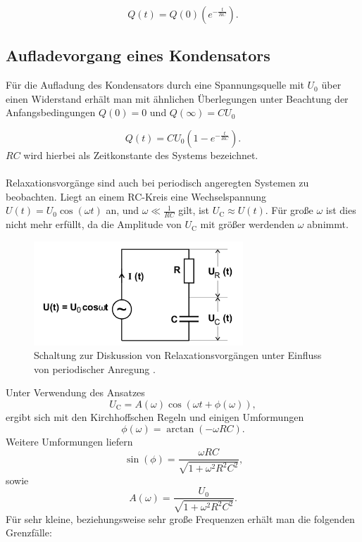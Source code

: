 \begin{equation}
	\label{eqn:aufladung}
	Q(t)=Q(0)(e^{-\frac{t}{RC}}) \text{.}
\end{equation}
\subsection{Aufladevorgang eines Kondensators}
Für die Aufladung des Kondensators durch eine Spannungsquelle mit $U_0$ über einen Widerstand erhält man mit ähnlichen Überlegungen unter Beachtung der Anfangsbedingungen $Q(0)=0$ und $Q(\infty)=CU_\text{0}$

\begin{equation}
	\label{eqn:entladung}
	Q(t)=CU_\text{0}(  1-e^{-\frac{t}{RC}} ) .
\end{equation}
$RC$ wird hierbei als Zeitkonstante des Systems bezeichnet.\\
\\Relaxationsvorgänge sind auch bei periodisch angeregten Systemen zu beobachten.
Liegt an einem RC-Kreis eine Wechselspannung $U(t)=U_\text{0}\cos(\omega t)$ an, und $\omega \ll \frac{1}{RC}$ gilt, ist $U_\text{C} \approx U(t)$.
Für große $\omega$ ist dies nicht mehr erfüllt, da die Amplitude von $U_\text{C}$ mit größer werdenden $\omega$ abnimmt.
\begin{figure}
	\centering
	\includegraphics[width=0.7\textwidth]{bilder/periodisch.png}
	\caption{Schaltung zur Diskussion von Relaxationsvorgängen unter Einfluss von periodischer Anregung \cite{Anleitung}.}
	\label{fig:periodisch}
\end{figure}
Unter Verwendung des Ansatzes
\begin{equation*}
	U_\text{C}=A(\omega)\cos(\omega t +\phi(\omega)) ,
\end{equation*}
ergibt sich mit den Kirchhoffschen Regeln und einigen Umformungen
\begin{equation}
	\label{eqn:phase}
	\phi(\omega)=\arctan(-\omega RC) \text{.}
\end{equation}
Weitere Umformungen liefern
\begin{equation}
	\label{eqn:sinphase}
	\sin(\phi)=\frac{\omega RC}{\sqrt{1+\omega ^2R^2C^2}} \text{,}
\end{equation}
sowie
\begin{equation}
	\label{eqn:amplitude}
	A(\omega)=\frac{U_\text{0}}{\sqrt{1+\omega ^2R^2C^2}} .
\end{equation}
Für sehr kleine, beziehungsweise sehr große Frequenzen erhält man die folgenden Grenzfälle:

